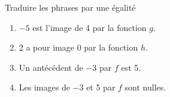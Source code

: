 
Traduire les phrases par une égalité
\begin{enumerate}
\item $-5$ est l'image de 4 par la fonction $g$.
\item 2 a pour image 0 par la fonction $h$.
\item Un antécédent de $-3$ par $f$ est 5.
\item Les images de $-3$ et 5 par $f$ sont nulles.
\end{enumerate}
